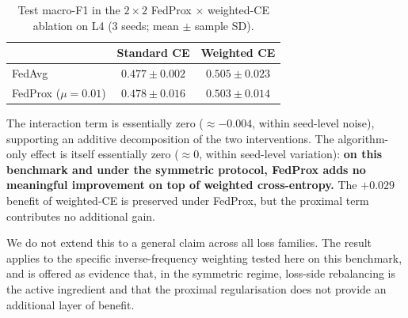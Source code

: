 \documentclass[11pt,a4paper]{report}
\begin{document}
\begin{table}[!htbp]
\centering
\caption{Test macro-F1 in the $2 \times 2$ FedProx $\times$
weighted-CE ablation on L4 (3 seeds; mean $\pm$ sample SD).}
\label{tab:wce-2x2}
\small
\begin{tabular}{lcc}
\toprule
                       & Standard CE     & Weighted CE     \\
\midrule
FedAvg                 & $0.477 \pm 0.002$ & $0.505 \pm 0.023$ \\
FedProx ($\mu = 0.01$) & $0.478 \pm 0.016$ & $0.503 \pm 0.014$ \\
\bottomrule
\end{tabular}
\end{table}

The interaction term is essentially zero ($\approx -0.004$, within
seed-level noise), supporting an additive decomposition of the two
interventions. The algorithm-only effect is itself essentially zero
($\approx 0$, within seed-level variation): \textbf{on this benchmark
and under the symmetric protocol, FedProx adds no meaningful
improvement on top of weighted cross-entropy.} The $+0.029$ benefit
of weighted-CE is preserved under FedProx, but the proximal term
contributes no additional gain.

We do not extend this to a general claim across all loss families.
The result applies to the specific inverse-frequency weighting
tested here on this benchmark, and is offered as evidence that, in
the symmetric regime, loss-side rebalancing is the active
ingredient and that the proximal regularisation does not provide
an additional layer of benefit.




\end{document}
